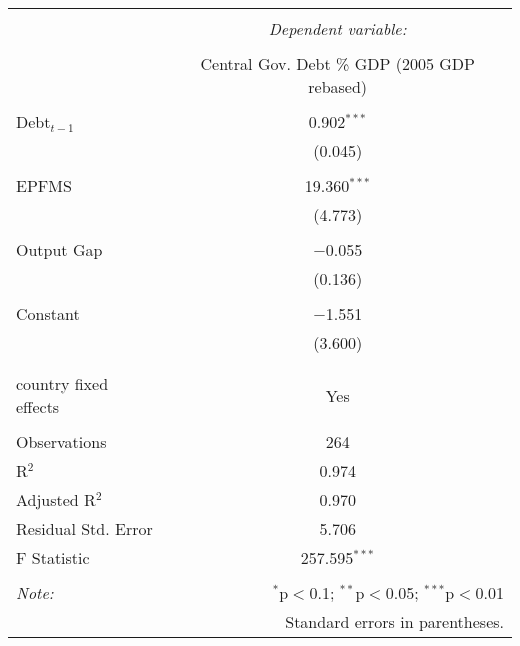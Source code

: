 
\begin{tabular}{@{\extracolsep{5pt}}lc} 
\\[-1.8ex]\hline 
\hline \\[-1.8ex] 
 & \multicolumn{1}{c}{\textit{Dependent variable:}} \\ 
\cline{2-2} 
\\[-1.8ex] & Central Gov. Debt \% GDP (2005 GDP rebased) \\ 
\hline \\[-1.8ex] 
 Debt$_{t-1}$ & 0.902$^{***}$ \\ 
  & (0.045) \\ 
  & \\ 
 EPFMS & 19.360$^{***}$ \\ 
  & (4.773) \\ 
  & \\ 
 Output Gap & $-$0.055 \\ 
  & (0.136) \\ 
  & \\ 
 Constant & $-$1.551 \\ 
  & (3.600) \\ 
  & \\ 
\hline \\[-1.8ex] 
country fixed effects & Yes \\ 
\hline \\[-1.8ex] 
Observations & 264 \\ 
R$^{2}$ & 0.974 \\ 
Adjusted R$^{2}$ & 0.970 \\ 
Residual Std. Error & 5.706 \\ 
F Statistic & 257.595$^{***}$ \\ 
\hline 
\hline \\[-1.8ex] 
\textit{Note:}  & \multicolumn{1}{r}{$^{*}$p$<$0.1; $^{**}$p$<$0.05; $^{***}$p$<$0.01} \\ 
 & \multicolumn{1}{r}{Standard errors in parentheses.} \\ 
\end{tabular} 
